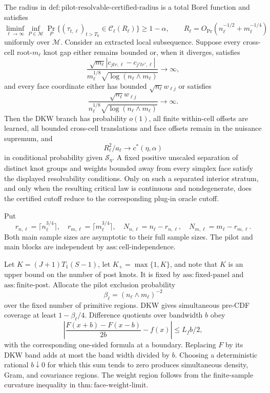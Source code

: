 The radius in \(\mathrm{def:pilot\mbox{-}resolvable\mbox{-}certified\mbox{-}radius}\) is a total Borel function and satisfies
\[
 \liminf_{\ell\to\infty}\inf_{P\in\mathcal M}
 \Pr_P\{(\tau_{t,\ell})_{t>T_0}\in\mathcal C_\ell(R_\ell)\}
 \geq1-\alpha,
 \qquad
 R_\ell=O_{\Pr}(n_\ell^{-1/2}+m_\ell^{-1/4})
\]
uniformly over \(\mathcal M\).  Consider an extracted local subsequence.  Suppose every cross-cell root-\(m_\ell\) knot gap either remains bounded or, when it diverges, satisfies
\[
 \frac{\sqrt{m_\ell}
 |c_{jtr,\ell}-c_{j'tr',\ell}|}
 {m_\ell^{1/8}\sqrt{\log(n_\ell\wedge m_\ell)}}\longrightarrow\infty,
\]
and every face coordinate either has bounded \(\sqrt{n_\ell}w_{\ell j}\) or satisfies
\[
 \frac{\sqrt{n_\ell}w_{\ell j}}
 {n_\ell^{1/8}\sqrt{\log(n_\ell\wedge m_\ell)}}
 \longrightarrow\infty.
\]
Then the DKW branch has probability \(o(1)\), all finite within-cell offsets are learned, all bounded cross-cell translations and face offsets remain in the nuisance supremum, and
\[
 R_\ell^2/a_\ell\longrightarrow c^*(\eta,\alpha)
\]
in conditional probability given \(\mathscr S_\eta\).  A fixed positive unscaled separation of distinct knot groups and weights bounded away from every simplex face satisfy the displayed resolvability conditions.  Only on such a separated interior stratum, and only when the resulting critical law is continuous and nondegenerate, does the certified cutoff reduce to the corresponding plug-in oracle cutoff.

Put
\[
 r_{n,\ell}=\lceil n_\ell^{3/4}\rceil,
 \quad r_{m,\ell}=\lceil m_\ell^{3/4}\rceil,
 \quad N_{n,\ell}=n_\ell-r_{n,\ell},
 \quad N_{m,\ell}=m_\ell-r_{m,\ell}.
\]
Both main sample sizes are asymptotic to their full sample sizes.  The pilot and main blocks are independent by \(\mathrm{ass:cell\mbox{-}independence}\).

Let \(K=(J+1)T_1(S-1)\), let \(K_+=\max\{1,K\}\), and note that \(K\) is an upper bound on the number of post knots.  It is fixed by \(\mathrm{ass:fixed\mbox{-}panel}\) and \(\mathrm{ass:finite\mbox{-}post}\).  Allocate the pilot exclusion probability
\[
 \beta_\ell=(n_\ell\wedge m_\ell)^{-2}
\]
over the fixed number of primitive regions.  DKW gives simultaneous pre-CDF coverage at least \(1-\beta_\ell/4\).  Difference quotients over bandwidth \(b\) obey
\[
 \left|\frac{F(x+b)-F(x-b)}{2b}-f(x)\right|
 \leq L_fb/2,
\]
with the corresponding one-sided formula at a boundary.  Replacing \(F\) by its DKW band adds at most the band width divided by \(b\).  Choosing a deterministic rational \(b\downarrow0\) for which this sum tends to zero produces simultaneous density, Gram, and covariance regions.  The weight region follows from the finite-sample curvature inequality in \(\mathrm{thm:face\mbox{-}weight\mbox{-}limit}\).

